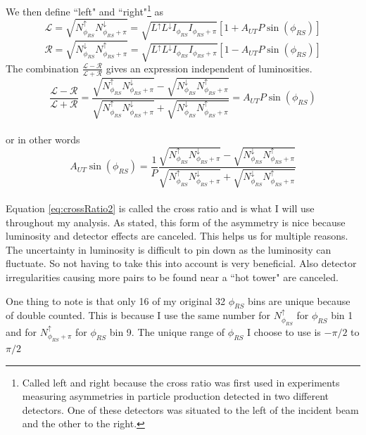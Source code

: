 \documentclass[abstract = on,listof=totoc, bibliography=totoc]{scrreprt}
\newcommand{\phirs}{\phi_{RS}}
\begin{document}
We then define ``left" and ``right"\footnote{Called left and right because the cross ratio was first used in experiments measuring asymmetries in particle production detected in two different detectors. One of these detectors was situated to the left of the incident beam and the other to the right.} as 
\begin{equation}
\mathcal{L} = \sqrt{N^\uparrow_{\phi_{RS}}N^\downarrow_{\phi_{RS}+\pi}}  = \sqrt{L^\uparrow L^\downarrow I_{\phi_{RS}} I_{\phi_{RS}+\pi}} \left[ 1+A_{UT}P\sin(\phi_{RS})\right]
\end{equation}
\begin{equation}
\mathcal{R} = \sqrt{N^\downarrow_{\phi_{RS}}N^\uparrow_{\phi_{RS}+\pi}} = \sqrt{L^\uparrow L^\downarrow I_{\phi_{RS}} I_{\phi_{RS}+\pi}} \left[ 1-A_{UT}P\sin(\phi_{RS})\right]
\end{equation}
The combination $\frac{\mathcal{L} - \mathcal{R}}{\mathcal{L} + \mathcal{R}}$  gives an expression independent of luminosities. 
\begin{equation}
\label{eq:crossRatio}
\frac{\mathcal{L} - \mathcal{R}}{\mathcal{L} +\mathcal{R}} = \frac{\sqrt{N^\uparrow_{\phi_{RS}}N^\downarrow_{\phi_{RS}+\pi}} - \sqrt{N^\downarrow_{\phi_{RS}}N^\uparrow_{\phi_{RS}+\pi}}}{\sqrt{N^\uparrow_{\phi_{RS}}N^\downarrow_{\phi_{RS}+\pi}} + \sqrt{N^\downarrow_{\phi_{RS}}N^\uparrow_{\phi_{RS}+\pi}}} = A_{UT}P\sin(\phi_{RS})
\end{equation}\\
or in other words
\begin{equation}
\label{eq:crossRatio2}
A_{UT}\sin\left(\phirs\right) = \frac{1}{P}\frac{\sqrt{N^\uparrow_{\phi_{RS}}N^\downarrow_{\phi_{RS}+\pi}} - \sqrt{N^\downarrow_{\phi_{RS}}N^\uparrow_{\phi_{RS}+\pi}}}{\sqrt{N^\uparrow_{\phi_{RS}}N^\downarrow_{\phi_{RS}+\pi}} + \sqrt{N^\downarrow_{\phi_{RS}}N^\uparrow_{\phi_{RS}+\pi}}}
\end{equation}\\

Equation \ref{eq:crossRatio2} is called the cross ratio and is what I will use throughout my analysis. As stated, this form of the asymmetry is nice because luminosity and detector effects are canceled. This helps us for multiple reasons. The uncertainty in luminosity is difficult to pin down as the luminosity can fluctuate. So not having to take this into account is very beneficial. Also detector irregularities causing more pairs to be found near a ``hot tower" are canceled.

One thing to note is that only 16 of my original 32 $\phi_{RS}$ bins are unique because of double counted. This is because I use the same number for $N^\uparrow_{\phi_{RS}}$ for $\phi_{RS}$ bin 1 and for $N^\uparrow_{\phi_{RS}+\pi}$ for $\phi_{RS}$ bin 9. The unique range of $\phi_{RS}$ I choose to use is $-\pi/2$ to $\pi/2$
\end{document}
